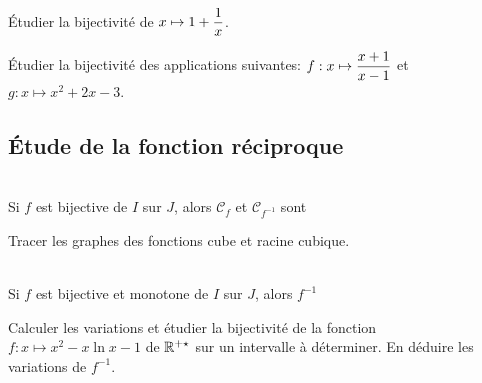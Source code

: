 \documentclass[a4paper, 11pt]{article}
\begin{document}
{\begin{exercice}
	\'Etudier la bijectivit\'e de $x\mapsto 1+\displaystyle\frac{1}{x}$.
\end{exercice}


\begin{exercice}
	\'Etudier la bijectivit\'e des applications suivantes: $f: x\mapsto \displaystyle\frac{x+1}{x-1}$ et $g: x\mapsto x^2+2x-3$.
\end{exercice}




\subsection{\'Etude de la fonction r\'eciproque}

{

	\begin{prop} \quad\\
		Si $f$ est bijective de $I$ sur $J$, alors  $\mathcal{C}_f$ et $\mathcal{C}_{f^{-1}}$ sont \dotfill%
	\end{prop}
}

\begin{exemple}
	Tracer les graphes des fonctions cube et racine cubique.

\end{exemple}



{

\begin{prop} \quad\\
	Si $f$ est bijective et monotone de $I$ sur $J$, alors $f^{-1}$ \dotfill%
\end{prop}
}


{\footnotesize
\begin{exercice} Calculer les variations et \'etudier la bijectivit\'e de la fonction $f: x\mapsto x^2-x\ln{x}-1$ de $\mathbb{R}^{+\star}$ sur un intervalle \`{a} d\'eterminer. En d\'eduire les variations de $f^{-1}$.
\end{exercice}}



{

}}
\end{document}
